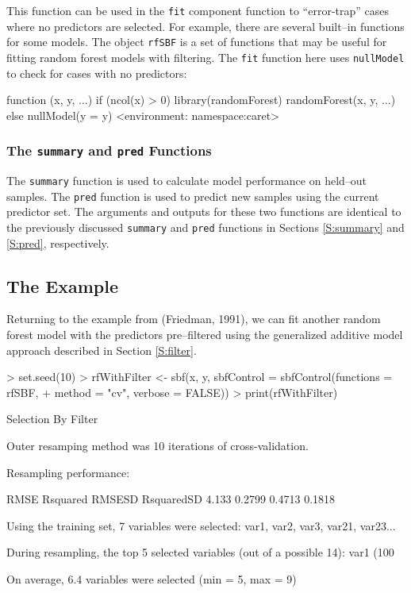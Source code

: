 \documentclass[12pt]{article}
\begin{document}
This function can be used in the \texttt{fit} component function to
``error-trap'' cases where no predictors are selected. For example,
there are several built--in functions for some models. The object
\texttt{rfSBF} is a set of functions that may be useful for fitting
random forest models with filtering. The \texttt{fit} function here
uses \texttt{nullModel} to check for cases with no predictors:
\begin{Schunk}
\begin{Soutput}
function (x, y, ...) 
{
    if (ncol(x) > 0) {
        library(randomForest)
        randomForest(x, y, ...)
    }
    else nullModel(y = y)
}
<environment: namespace:caret>
\end{Soutput}
\end{Schunk}

\subsubsection{The \texttt{summary} and \texttt{pred} Functions}

The \texttt{summary} function is used to calculate model performance on held--out samples. The \texttt{pred} function is used to predict new samples using the current
predictor set. The arguments and outputs for these two functions are identical to the previously discussed \texttt{summary} and \texttt{pred} functions in Sections \ref{S:summary} and \ref{S:pred}, respectively.

\subsection{The Example}

Returning to the example from (Friedman, 1991), we can fit another
random forest model with the predictors pre--filtered using the
generalized additive model approach described in Section \ref{S:filter}.

\begin{Schunk}
\begin{Sinput}
> set.seed(10)
> rfWithFilter <- sbf(x, y, sbfControl = sbfControl(functions = rfSBF, 
+     method = "cv", verbose = FALSE))
> print(rfWithFilter)
\end{Sinput}
\begin{Soutput}
Selection By Filter

Outer resamping method was 10 iterations of cross-validation. 

Resampling performance:

  RMSE Rsquared RMSESD RsquaredSD
 4.133   0.2799 0.4713     0.1818

Using the training set, 7 variables were selected:
   var1, var2, var3, var21, var23...

During resampling, the top 5 selected variables (out of a possible 14):
   var1 (100%), var3 (100%), var42 (100%), var2 (90%), var23 (60%)

On average, 6.4 variables were selected (min = 5, max = 9)
\end{Soutput}
\end{Schunk}
\end{document}
